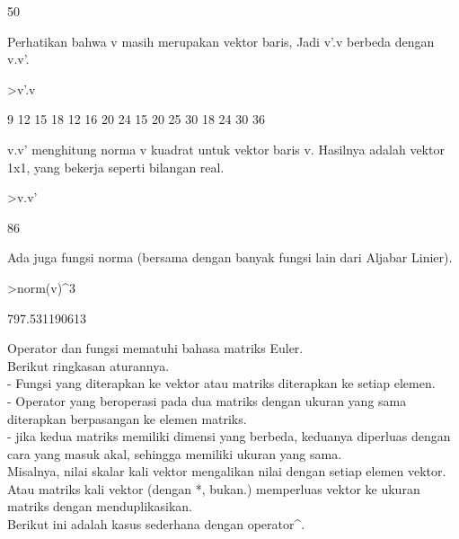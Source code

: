\documentclass[a4paper,10pt]{article}
\begin{document}
\begin{eulernotebook}
\begin{eulercomment}
\begin{eulercomment}
\begin{eulercomment}
\begin{eulercomment}
\begin{euleroutput}
  50
\end{euleroutput}
\begin{eulercomment}
Perhatikan bahwa v masih merupakan vektor baris, Jadi v'.v berbeda
dengan v.v'.
\end{eulercomment}
\begin{eulerprompt}
>v'.v
\end{eulerprompt}
\begin{euleroutput}
              9            12            15            18 
             12            16            20            24 
             15            20            25            30 
             18            24            30            36 
\end{euleroutput}
\begin{eulercomment}
v.v' menghitung norma v kuadrat untuk vektor baris v. Hasilnya adalah
vektor 1x1, yang bekerja seperti bilangan real.
\end{eulercomment}
\begin{eulerprompt}
>v.v'
\end{eulerprompt}
\begin{euleroutput}
  86
\end{euleroutput}
\begin{eulercomment}
Ada juga fungsi norma (bersama dengan banyak fungsi lain dari Aljabar
Linier).
\end{eulercomment}
\begin{eulerprompt}
>norm(v)^3
\end{eulerprompt}
\begin{euleroutput}
  797.531190613
\end{euleroutput}
\begin{eulercomment}
Operator dan fungsi mematuhi bahasa matriks Euler.\\
Berikut ringkasan aturannya.\\
- Fungsi yang diterapkan ke vektor atau matriks diterapkan ke setiap
elemen.\\
- Operator yang beroperasi pada dua matriks dengan ukuran yang sama
diterapkan berpasangan ke elemen matriks.\\
- jika kedua matriks memiliki dimensi yang berbeda, keduanya diperluas
dengan cara yang masuk akal, sehingga memiliki ukuran yang sama.\\
Misalnya, nilai skalar kali vektor mengalikan nilai dengan setiap
elemen vektor. Atau matriks kali vektor (dengan *, bukan.) memperluas
vektor ke ukuran matriks dengan menduplikasikan.\\
Berikut ini adalah kasus sederhana dengan operator\textasciicircum{}.

\end{eulercomment}
\end{eulercomment}
\end{eulercomment}
\end{eulercomment}
\end{eulercomment}
\end{eulernotebook}
\end{document}
